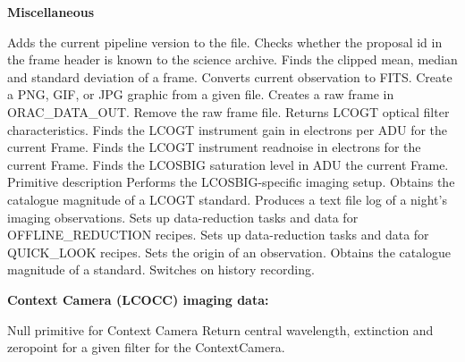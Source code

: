 \documentclass[twoside,11pt,nolof]{starlink}
\begin{document}
\begin{small}
{\large
\begin{center}
\textbf{Miscellaneous}
\end{center}
}
\begin{description}
Adds the current pipeline version to the file.
Checks whether the proposal id in the frame header is known to the science archive.
Finds the clipped mean, median and standard deviation of a frame.
Converts current observation to FITS.
Create a PNG, GIF, or JPG graphic from a given file.
Creates a raw frame in ORAC\_DATA\_OUT.
Remove the raw frame file.
Returns LCOGT optical filter characteristics.
Finds the LCOGT instrument gain in electrons per ADU for the current Frame.
Finds the LCOGT instrument readnoise in electrons for the current Frame.
Finds the LCOSBIG saturation level in ADU the current Frame.
Primitive description
Performs the LCOSBIG-specific imaging setup.
Obtains the catalogue magnitude of a LCOGT standard.
Produces a text file log of a night's imaging observations.
Sets up data-reduction tasks and data for OFFLINE\_REDUCTION recipes.
Sets up data-reduction tasks and data for QUICK\_LOOK recipes.
Sets the origin of an observation.
Obtains the catalogue magnitude of a standard.
Switches on history recording.
\end{description}

{\large
\begin{center}
\textbf{Context Camera (LCOCC) imaging data:}
\end{center}
}

\begin{description}
Null primitive for Context Camera
Return central wavelength, extinction and zeropoint for a given filter for the
ContextCamera.
\end{description}


\end{small}
\end{document}
